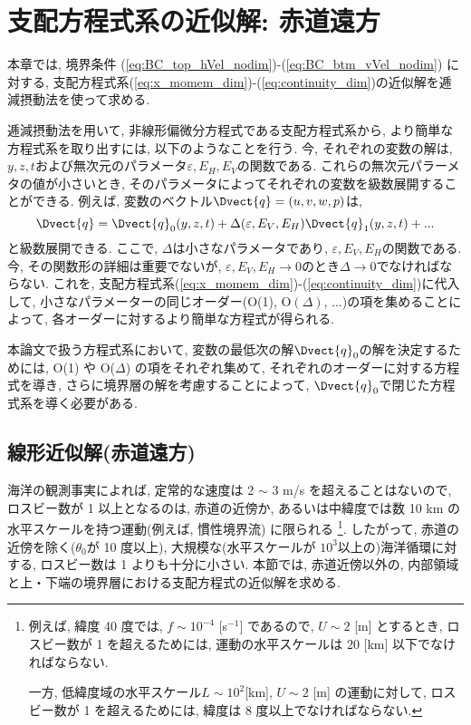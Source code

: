 \chapter{支配方程式系の近似解: 赤道遠方}
本章では, 境界条件 (\ref{eq:BC_top_hVel_nodim})-(\ref{eq:BC_btm_vVel_nodim}) に対する, 
支配方程式系(\ref{eq:x_momem_dim})-(\ref{eq:continuity_dim})の近似解を逓減摂動法を使って求める. 

逓減摂動法を用いて, 非線形偏微分方程式である支配方程式系から, より簡単な方程式系を取り出すには, 
以下のようなことを行う. 
今, それぞれの変数の解は, $y,z,t$および無次元のパラメータ$\varepsilon, E_H, E_V$の関数である. 
これらの無次元パラーメタの値が小さいとき, そのパラメータによってそれぞれの変数を級数展開することができる. 
例えば, 変数のベクトル$\Dvect{q}=(u,v,w,p)$は, 
\begin{equation}
  \Dvect{q} = \Dvect{q}_0(y,z,t) + \Delta(\varepsilon,E_V,E_H)\Dvect{q}_1 (y,z,t) + ...
\label{eq:variable_expand}
\end{equation}
と級数展開できる. 
ここで, $\Delta$は小さなパラメータであり, $\varepsilon,E_V,E_H$の関数である. 
今, その関数形の詳細は重要でないが,   
$\varepsilon, E_V,E_H \to 0$のとき$\Delta \to 0$でなければならない. 
これを, 支配方程式系(\ref{eq:x_momem_dim})-(\ref{eq:continuity_dim})に代入して, 
小さなパラメーターの同じオーダー(O(1), O$(\Delta)$, ...)の項を集めることによって, 
各オーダーに対するより簡単な方程式が得られる. 

本論文で扱う方程式系において, 
変数の最低次の解$\Dvect{q}_0$の解を決定するためには, 
O(1) や O($\Delta$) の項をそれぞれ集めて, それぞれのオーダーに対する方程式を導き, 
さらに境界層の解を考慮することによって, 
$\Dvect{q}_0$で閉じた方程式系を導く必要がある. 

\section{線形近似解(赤道遠方)} 

海洋の観測事実によれば, 定常的な速度は 2 $\sim$ 3 m/s を超えることはないので, 
ロスビー数が 1 以上となるのは, 赤道の近傍か, あるいは中緯度では数 10 km の水平スケールを持つ運動(例えば, 慣性境界流)
に限られる%
\footnote{
例えば, 緯度 40 度では, $f \sim 10^{-4}$ [s$^{-1}$] であるので, $U \sim 2$ [m] とするとき, 
ロスビー数が 1 を超えるためには, 運動の水平スケールは 20 [km] 以下でなければならない. 

一方, 低緯度域の水平スケール$L \sim 10^2$[km], $U \sim 2$ [m] の運動に対して,   
ロスビー数が 1 を超えるためには, 緯度は 8 度以上でなければならない. 
}. 
したがって, 赤道の近傍を除く($\theta_0$が 10 度以上), 大規模な(水平スケールが $10^3$以上の)海洋循環に対する, 
ロスビー数は 1 よりも十分に小さい. 
本節では, 赤道近傍以外の, 内部領域と上・下端の境界層における支配方程式の近似解を求める. 

